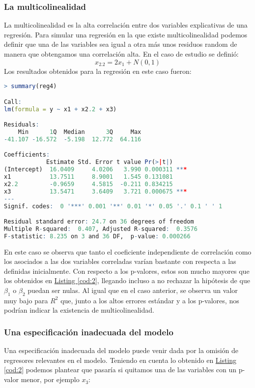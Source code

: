 \documentclass[12pt,a4paper]{article}
\begin{document}
\subsubsection{La multicolinealidad}
La multicolinealidad es la alta correlación entre dos variables explicativas de una regresión. Para simular una regresión en la que existe multicolinealidad podemos definir que una de las variables sea igual a otra más unos residuos random de manera que obtengamos una correlación alta. En el caso de estudio se definió:
\begin{equation*}
    x_{2.2} = 2x_1 + N(0,1)
\end{equation*}
Los resultados obtenidos para la regresión en este caso fueron:
\begin{lstlisting}[language=R, caption = Regresión lineal con multicolinealidad, label =cod:5]
> summary(reg4)

Call:
lm(formula = y ~ x1 + x2.2 + x3)

Residuals:
    Min      1Q  Median      3Q     Max 
-41.107 -16.572  -5.198  12.772  64.116 

Coefficients:
            Estimate Std. Error t value Pr(>|t|)    
(Intercept)  16.0409     4.0206   3.990 0.000311 ***
x1           13.7511     8.9001   1.545 0.131081    
x2.2         -0.9659     4.5815  -0.211 0.834215    
x3           13.5471     3.6409   3.721 0.000675 ***
---
Signif. codes:  0 '***' 0.001 '**' 0.01 '*' 0.05 '.' 0.1 ' ' 1

Residual standard error: 24.7 on 36 degrees of freedom
Multiple R-squared:  0.407,	Adjusted R-squared:  0.3576 
F-statistic: 8.235 on 3 and 36 DF,  p-value: 0.000266
\end{lstlisting}
En este caso se observa que tanto el coeficiente independiente de correlación como los asociados a las dos variables correladas varían bastante con respecta a las definidas inicialmente. Con respecto a los p-valores, estos son mucho mayores que los obtenidos en \hyperref[cod:2]{Listing \ref{cod:2}}, llegando incluso a no rechazar la hipótesis de que $\beta_1$ o $\beta_2$ puedan ser nulas. Al igual que en el caso anterior, se observa un valor muy bajo para $R^2$ que, junto a los altos errores estándar y a los p-valores, nos podrían indicar la existencia de multicolinealidad.

\subsubsection{Una especificación inadecuada del modelo}
Una especificación inadecuada del modelo puede venir dada por la omisión de regresores relevantes en el modelo. Teniendo en cuenta lo obtenido en \hyperref[cod:2]{Listing \ref{cod:2}} podemos plantear que pasaría si quitamos una de las variables con un p-valor menor, por ejemplo $x_3$:
\end{document}
